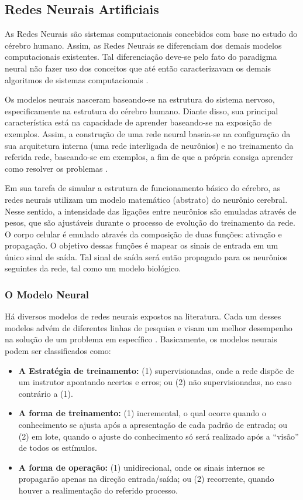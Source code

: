 \documentclass[12pt]{article}
\begin{document}
\subsection{Redes Neurais Artificiais}

As Redes Neurais são sistemas computacionais concebidos com base no estudo do cérebro humano. Assim, as Redes Neurais se diferenciam dos demais modelos computacionais existentes. Tal diferenciação deve-se pelo fato do paradigma neural não fazer uso dos conceitos que até então caracterizavam os demais algoritmos de sistemas computacionais \cite{thome2002redes}.

Os modelos neurais nasceram baseando-se na estrutura do sistema nervoso, especificamente na estrutura do cérebro humano. Diante disso, sua principal característica está na capacidade de aprender baseando-se na exposição de exemplos. Assim, a construção de uma rede neural baseia-se na configuração da sua arquitetura interna (uma rede interligada de neurônios) e no treinamento da referida rede, baseando-se em exemplos, a fim de que a própria consiga aprender como resolver os problemas \cite{thome2002redes}.

Em sua tarefa de simular a estrutura de funcionamento básico do cérebro, as redes neurais utilizam um modelo matemático (abstrato) do neurônio cerebral. Nesse sentido, a intensidade das ligações entre neurônios são emuladas através de pesos, que são ajustáveis durante o processo de evolução do treinamento da rede. O corpo celular é emulado através da composição de duas funções: ativação e propagação. O objetivo dessas funções é mapear os sinais de entrada em um único sinal de saída. Tal sinal de saída será então propagado para os neurônios seguintes da rede, tal como um modelo biológico.

\subsubsection{O Modelo Neural}

Há diversos modelos de redes neurais expostos na literatura. Cada um desses modelos advém de diferentes linhas de pesquisa e visam um melhor desempenho na solução de um problema em específico \cite{fausett2006fundamentals}. Basicamente, os modelos neurais podem ser classificados como:

\begin{itemize}
    \item \textbf{A Estratégia de treinamento:} (1) supervisionadas, onde a rede dispõe de um instrutor apontando acertos e erros; ou (2) não supervisionadas, no caso contrário a (1).
    \item \textbf{A forma de treinamento:} (1) incremental, o qual ocorre quando o conhecimento se ajusta após a apresentação de cada padrão de entrada; ou (2) em lote, quando o ajuste do conhecimento só será realizado após a ``visão'' de todos os estímulos.
    \item \textbf{A forma de operação:} (1) unidirecional, onde os sinais internos se propagarão apenas na direção entrada/saída; ou (2) recorrente, quando houver a realimentação do referido processo.
\end{itemize}
\end{document}

